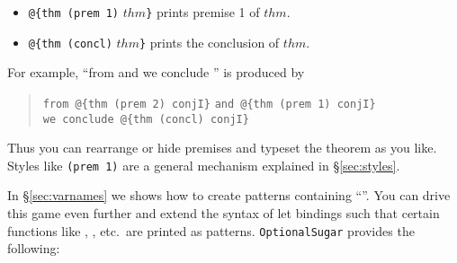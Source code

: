 \begin{isabellebody}
\begin{isamarkuptext}
\begin{itemize}
\item \verb!@!\verb!{thm (prem 1)! $thm$\verb!}!
prints premise 1 of $thm$.
\item \verb!@!\verb!{thm (concl)! $thm$\verb!}!
prints the conclusion of $thm$.
\end{itemize}
For example, ``from  and
 we conclude ''
is produced by
\begin{quote}
\verb!from !\verb!@!\verb!{thm (prem 2) conjI}! \verb!and !\verb!@!\verb!{thm (prem 1) conjI}!\\
\verb!we conclude !\verb!@!\verb!{thm (concl) conjI}!
\end{quote}
Thus you can rearrange or hide premises and typeset the theorem as you like.
Styles like \verb!(prem 1)! are a general mechanism explained
in \S\ref{sec:styles}.%
\end{isamarkuptext}%
\isamarkuptrue%
%
\isamarkuptrue%
%
\begin{isamarkuptext}%
In \S\ref{sec:varnames} we shows how to create patterns containing
  ``\isa{\_}''.
  You can drive this game even further and extend the syntax of let
  bindings such that certain functions like , , 
  etc.\ are printed as patterns. \texttt{OptionalSugar} provides the
  following:
  

\end{isamarkuptext}
\end{isabellebody}
